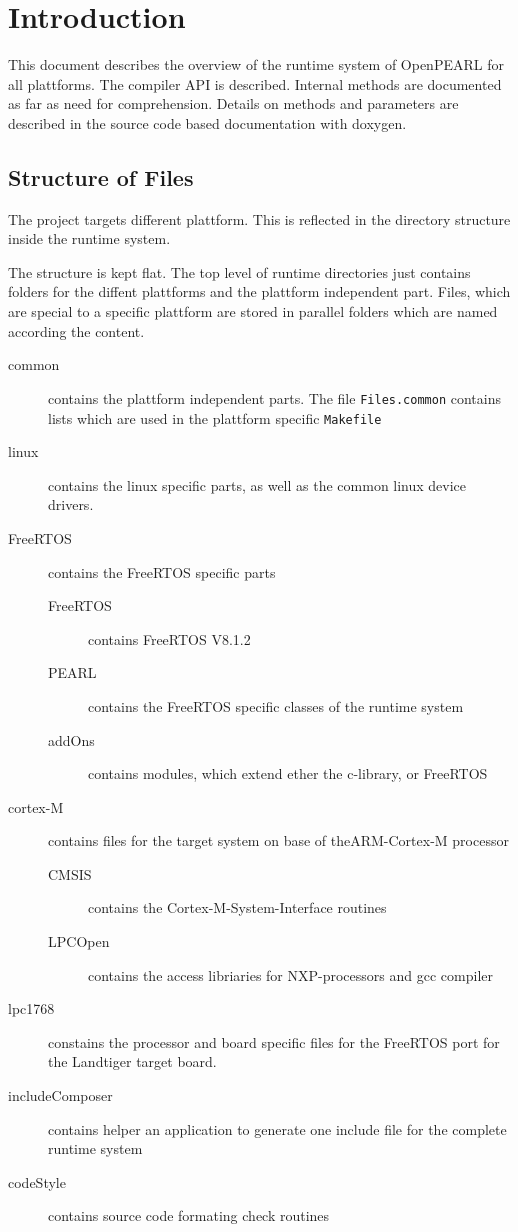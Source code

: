 \chapter{Introduction}

This document describes the overview of the runtime system
of OpenPEARL for all plattforms.
The compiler API is described.
Internal methods are documented as far as need for comprehension.
Details on methods and parameters are 
described in the source code based documentation with doxygen.

\section{Structure of Files}
The project targets different plattform. 
This is reflected in the directory structure inside the runtime system.

The structure is kept flat. The top level of runtime directories
just contains folders for the diffent plattforms and the plattform
independent part. Files, which are special to a specific plattform
are stored in parallel folders which are named according the content.
\begin{description}
\item[common] contains the plattform independent parts.
   The file \verb|Files.common| contains lists which are used in the
  plattform specific  \verb|Makefile|
\item[linux] contains the linux specific parts, as well as the common
   linux device drivers. 
\item[FreeRTOS] contains the FreeRTOS specific parts
  \begin{description}
  \item[FreeRTOS] contains FreeRTOS V8.1.2
  \item [PEARL] contains the FreeRTOS specific classes of the runtime system
  \item[addOns] contains modules, which extend ether the c-library, or
                FreeRTOS
  \end{description}
\item[cortex-M] contains files for the target system on base of theARM-Cortex-M
   processor
   \begin{description}
   \item[CMSIS] contains the Cortex-M-System-Interface routines
   \item[LPCOpen] contains the access libriaries for NXP-processors and
              gcc compiler
   \end{description}
\item[lpc1768] constains the processor and board specific
   files for the FreeRTOS port for the Landtiger target board.
\item[includeComposer] contains helper an application to generate 
   one include file for the complete runtime system
\item[codeStyle] contains source code formating check routines
\end{description}

